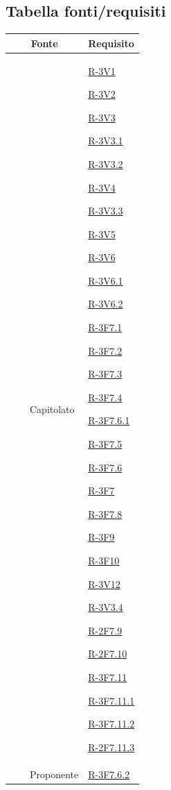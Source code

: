 \documentclass[12pt,a4paper]{article}
\begin{document}
\subsection{Tabella fonti/requisiti}
\begin{longtable}{r l p{5cm} p{3cm}}
	\toprule
	\multicolumn{3}{c}{Fonte} & Requisito\tabularnewline
	\midrule
	\midrule
	&  & Capitolato & \hyperlink{R-3V1}{R-3V1}
	
	\hyperlink{R-3V2}{R-3V2}
	
	\hyperlink{R-3V3}{R-3V3}
	
	\hyperlink{R-3V3.1}{R-3V3.1}
	
	\hyperlink{R-3V3.2}{R-3V3.2}
	
	\hyperlink{R-3V4}{R-3V4}
	
	\hyperlink{R-3V3.3}{R-3V3.3}
	
	\hyperlink{R-3V5}{R-3V5}
	
	\hyperlink{R-3V6}{R-3V6}
	
	\hyperlink{R-3V6.1}{R-3V6.1}
	
	\hyperlink{R-3V6.2}{R-3V6.2}
	
	\hyperlink{R-3F7.1}{R-3F7.1}
	
	\hyperlink{R-3F7.2}{R-3F7.2}
	
	\hyperlink{R-3F7.3}{R-3F7.3}
	
	\hyperlink{R-3F7.4}{R-3F7.4}
	
	\hyperlink{R-3F7.6.1}{R-3F7.6.1}
	
	\hyperlink{R-3F7.5}{R-3F7.5}
	
	\hyperlink{R-3F7.6}{R-3F7.6}
	
	\hyperlink{R-3F7}{R-3F7}
	
	\hyperlink{R-3F7.8}{R-3F7.8}
	
	\hyperlink{R-3F9}{R-3F9}
	
	\hyperlink{R-3F10}{R-3F10}
	
	\hyperlink{R-3V12}{R-3V12}
	
	\hyperlink{R-3V3.4}{R-3V3.4}
	
	\hyperlink{R-2F7.9}{R-2F7.9}
	
	\hyperlink{R-2F7.10}{R-2F7.10}
	
	\hyperlink{R-3F7.11}{R-3F7.11}
	
	\hyperlink{R-3F7.11.1}{R-3F7.11.1}
	
	\hyperlink{R-3F7.11.2}{R-3F7.11.2}
	
	\hyperlink{R-2F7.11.3}{R-2F7.11.3}\tabularnewline
	\hline
	&  & Proponente & \hyperlink{R-3F7.6.2}{R-3F7.6.2}
	

\end{longtable}
\end{document}
